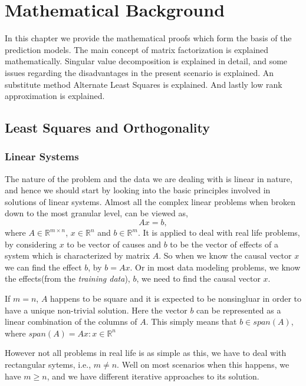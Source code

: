 \chapter{Mathematical Background}

\textsf{ In this chapter we provide the mathematical proofs which form the basis
of the prediction models. The main concept of matrix factorization is explained
mathematically. Singular value decomposition is explained in detail, and some
issues regarding the disadvantages in the present scenario is explained. An
substitute method Alternate Least Squares is explained. And lastly low rank
approximation is explained.}

\section{Least Squares and Orthogonality}
\subsection{Linear Systems}
The nature of the problem and the data we are dealing with is linear in nature,
and hence we should start by looking into the basic principles involved in
solutions of linear systems. Almost all the complex linear problems when broken
down to the most granular level, can be viewed as,
\begin{equation} 
  Ax=b,
\label{eq:4.1}  
\end{equation}
where $A\in\mathbb{R}^{m \times	 n}$, $x\in \mathbb{R}^n$ and $b\in
\mathbb{R}^m$. It
is applied to deal with real life problems, by considering $x$ to be vector of
causes and $b$ to be the vector of effects of a system which is characterized by
matrix $A$. So when we know the causal vector $x$ we can find the effect $b$, by
$b=Ax$. Or in most data modeling problems, we know the effects(from the
\emph{training data}), $b$, we need to find the causal vector $x$. 

If $m=n$, $A$ happens to be square and it is
expected to be nonsingluar in order to have a unique non-trivial solution. Here
the vector $b$ can be represented as a linear combination of the columns of $A$.
This simply means that $b\in span(A)$, where $span(A)={Ax:x\in \mathbb{R}^n}$ 

However not all problems in real life is as simple as this, we have to deal with
rectangular sytems, i.e., $m\neq n$. Well on most scenarios when this happens,
we have $m\geq n$, and we have different iterative approaches to its solution. 
